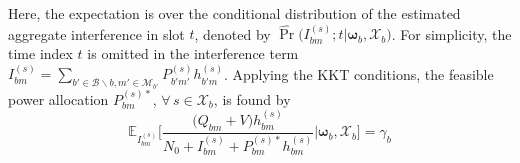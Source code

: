 \documentclass[conference]{IEEEtran}
\newcommand{\totalpower}[1]{%
	\overline{P}_{#1}%
}
\begin{document}
%
%
%
Here, the expectation is over the conditional distribution  of the estimated aggregate interference in slot $t$, denoted by $\hat{\Pr}\big(I_{bm}^{(s)};t|\boldsymbol{\omega}_b,\mathcal{X}_b\big)$.
For simplicity, the time index $t$ is omitted in the interference term $I_{bm}^{(s)}=\sum_{b'\in\mathcal{B}\backslash b,m'\in\mathcal{M}_{b'}}P_{b'm'}^{(s)}  h_{b'm}^{(s)}$.
%
%
%
Applying the KKT conditions,
the feasible power allocation $P_{bm}^{(s)*}$, $\forall\,s\in\mathcal{X}_b$, is found by
%
%
\begin{equation}
%
\mathbb{E}_{I_{bm}^{(s)}}\bigg[\frac{\big(Q_{bm}+V\big)h_{bm}^{(s)}}{N_0+ I_{bm}^{(s)}+P_{bm}^{(s)*}h_{bm}^{(s)}} \bigg|\boldsymbol{\omega}_b,\mathcal{X}_b\bigg] =\gamma_b\label{Eq: BS water-willing}
%
\end{equation}
\end{document}
